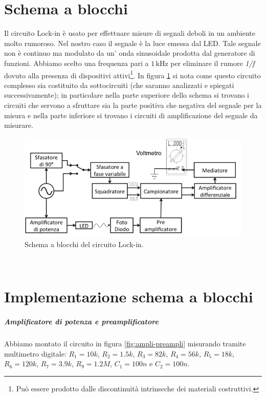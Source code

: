 \documentclass[10pt,a4paper]{article}
\begin{document}
\section{Schema a blocchi}
Il circuito Lock-in è usato per effettuare misure di segnali deboli in un ambiente molto rumoroso. Nel nostro caso il segnale è la luce emessa dal LED. Tale segnale non è continuo ma modulato da un' onda sinusoidale prodotta dal generatore di funzioni. Abbiamo scelto una frequenza pari a $1\,\mbox{kHz}$ per eliminare il rumore \emph{1/f} dovuto alla presenza di dispositivi attivi\footnote{Può essere prodotto dalle discontinuità intrinseche dei materiali costruttivi.}. In figura \ref{fig:schemablocchi} si nota come questo circuito complesso sia costituito da sottocircuiti (che saranno analizzati e spiegati successivamente); in particolare nella parte superiore dello schema si trovano i circuiti che servono a sfruttare sia la parte positiva che negativa del segnale per la misura e nella parte inferiore si trovano i circuiti di amplificazione del segnale da misurare.

\begin{figure}[!htb]
  \centering
  \includegraphics[scale=0.75]{schemablocchi.png}
\caption{Schema a blocchi del circuito Lock-in.\label{fig:schemablocchi}}
\end{figure}
\\

\section{Implementazione schema a blocchi}

\subparagraph{Amplificatore di potenza e preamplificatore}
Abbiamo montato il circuito in figura \ref{fig:ampli-preampli} misurando tramite multimetro digitale: $R_1=10k$, $R_2=1.5k$, $R_3=82k$, $R_4=56k$, $R_5=18k$, $R_6=120k$, $R_7=3.9k$, $R_9=1.2M$, $C_1=100n$ e $C_2=100n$.\\
\end{document}

